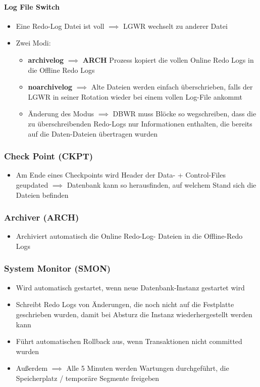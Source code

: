 \paragraph{Log File Switch}
\begin{itemize}
    \item Eine Redo-Log Datei ist voll $\implies$ LGWR wechselt zu anderer Datei
    \item Zwei Modi:
    \begin{itemize}
        \item \textbf{archivelog} $\implies$ \textbf{ARCH} Prozess kopiert die vollen Online Redo Logs in die Offline Redo Logs
        \item \textbf{noarchivelog} $\implies$ Alte Dateien werden einfach überschrieben, falls der LGWR in seiner Rotation wieder bei einem vollen Log-File ankommt
        \item Änderung des Modus $\implies$ DBWR muss Blöcke so wegschreiben, dass die zu überschreibenden Redo-Logs nur Informationen enthalten, die bereits auf die Daten-Dateien übertragen wurden
    \end{itemize}
\end{itemize}

\subsubsection{Check Point (CKPT)}
\begin{itemize}
    \item Am Ende eines Checkpoints wird Header der Data- + Control-Files geupdated $\implies$ Datenbank kann so herausfinden, auf welchem Stand sich die Dateien befinden
\end{itemize}

\subsubsection{Archiver (ARCH)}
\begin{itemize}
    \item Archiviert automatisch die Online Redo-Log- Dateien in die Offline-Redo Logs
\end{itemize}

\subsubsection{System Monitor (SMON)}
\begin{itemize}
    \item Wird automatisch gestartet, wenn neue Datenbank-Instanz gestartet wird
    \item Schreibt Redo Logs von Änderungen, die noch nicht auf die Festplatte geschrieben wurden, damit bei Absturz die Instanz wiederhergestellt werden kann
    \item Führt automatischen Rollback aus, wenn Transaktionen nicht committed wurden
    \item Außerdem $\implies$ Alle 5 Minuten werden Wartungen durchgeführt, die Speicherplatz / temporäre Segmente freigeben
\end{itemize}

